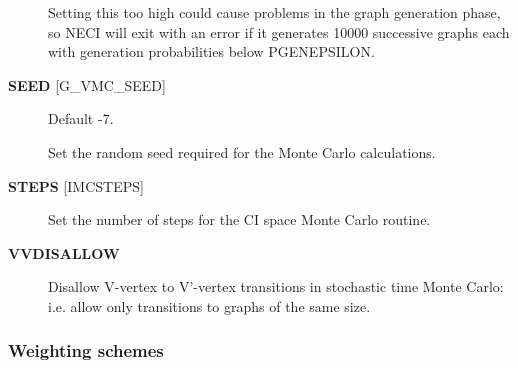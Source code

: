 \documentclass[openany,a4paper,10pt,english]{manual}
\begin{document}
\begin{description}
Setting this too high could cause problems in the graph generation phase,
so NECI will exit with an error if it generates 10000 successive
graphs each with generation probabilities below PGENEPSILON.

\item[\textbf{SEED} {[}G\_VMC\_SEED{]}] \leavevmode
Default -7.

Set the random seed required for the Monte Carlo calculations.

\item[\textbf{STEPS} {[}IMCSTEPS{]}] \leavevmode
Set the number of steps for the CI space Monte Carlo routine.

\item[\textbf{VVDISALLOW}] \leavevmode
Disallow V-vertex to V'-vertex transitions in stochastic time Monte
Carlo: i.e. allow only transitions to graphs of the same size.

\end{description}


\subsubsection{Weighting schemes}
\end{document}
